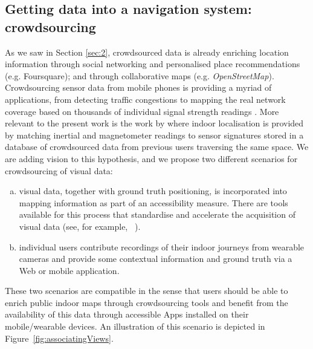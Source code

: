 \subsection{Getting data into a navigation system: crowdsourcing}
As we saw in Section \ref{sec:2}, crowdsourced data is already enriching location information through social networking and personalised place recommendations (e.g. Foursquare); and through collaborative maps (e.g. \textit{OpenStreetMap}). Crowdsourcing sensor data from mobile phones is providing a myriad of applications, from detecting traffic congestions \citep{barth2009bright} to mapping the real network coverage based on thousands of individual signal strength readings \citep{ltereport2013android}. More relevant to the present work is the work by \citet{wang2012no} where indoor localisation is provided by matching inertial and magnetometer readings to sensor signatures stored in a database of crowdsourced data from previous users traversing the same space. We are adding vision to this hypothesis, and we propose two different scenarios for crowdsourcing of visual data:
\begin{enumerate}[a)] 
\item visual data, together with ground truth positioning, is incorporated into mapping information as part of an accessibility measure. There are tools available for this process that standardise and accelerate the acquisition of visual data (see, for example, ~\citep{navvisTrolley}).
\item individual users contribute recordings of their indoor journeys from wearable cameras and provide some contextual information and ground truth via a Web or mobile application. 
\end{enumerate}

These two scenarios are compatible in the sense that users should be able to enrich public indoor maps through crowdsourcing tools and benefit from the availability of this data through accessible Apps installed on their mobile/wearable devices. An illustration of this scenario is depicted in Figure~\ref{fig:associatingViews}.

